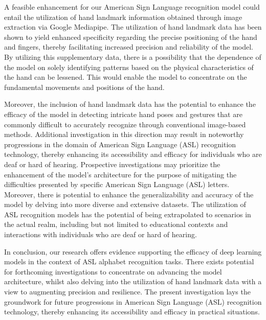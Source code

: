 \documentclass[conference]{IEEEtran}
\begin{document}
A feasible enhancement for our American Sign Language recognition model could entail the utilization of hand landmark information obtained through image extraction via Google Mediapipe. The utilization of hand landmark data has been shown to yield enhanced specificity regarding the precise positioning of the hand and fingers, thereby facilitating increased precision and reliability of the model. By utilizing this supplementary data, there is a possibility that the dependence of the model on solely identifying patterns based on the physical characteristics of the hand can be lessened. This would enable the model to concentrate on the fundamental movements and positions of the hand.

Moreover, the inclusion of hand landmark data has the potential to enhance the efficacy of the model in detecting intricate hand poses and gestures that are commonly difficult to accurately recognize through conventional image-based methods. Additional investigation in this direction may result in noteworthy progressions in the domain of American Sign Language (ASL) recognition technology, thereby enhancing its accessibility and efficacy for individuals who are deaf or hard of hearing.
Prospective investigations may prioritize the enhancement of the model's architecture for the purpose of mitigating the difficulties presented by specific American Sign Language (ASL) letters. Moreover, there is potential to enhance the generalizability and accuracy of the model by delving into more diverse and extensive datasets. The utilization of ASL recognition models has the potential of being extrapolated to scenarios in the actual realm, including but not limited to educational contexts and interactions with individuals who are deaf or hard of hearing.

In conclusion, our research offers evidence supporting the efficacy of deep learning models in the context of ASL alphabet recognition tasks. There exists potential for forthcoming investigations to concentrate on advancing the model architecture, whilst also delving into the utilization of hand landmark data with a view to augmenting precision and resilience. The present investigation lays the groundwork for future progressions in American Sign Language (ASL) recognition technology, thereby enhancing its accessibility and efficacy in practical situations.
\end{document}
